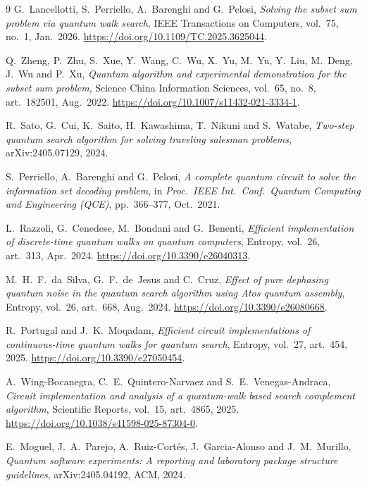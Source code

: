 \documentclass[11pt,a4paper]{article}
\begin{document}
\begin{thebibliography}{9}
G.~Lancellotti, S.~Perriello, A.~Barenghi and G.~Pelosi,
\emph{Solving the subset sum problem via quantum walk search},
IEEE Transactions on Computers, vol.~75, no.~1, Jan.~2026.
\url{https://doi.org/10.1109/TC.2025.3625044}.

Q.~Zheng, P.~Zhu, S.~Xue, Y.~Wang, C.~Wu, X.~Yu, M.~Yu, Y.~Liu, M.~Deng,
J.~Wu and P.~Xu,
\emph{Quantum algorithm and experimental demonstration for the subset sum
problem},
Science China Information Sciences, vol.~65, no.~8, art.~182501, Aug.~2022.
\url{https://doi.org/10.1007/s11432-021-3334-1}.

R.~Sato, G.~Cui, K.~Saito, H.~Kawashima, T.~Nikuni and S.~Watabe,
\emph{Two-step quantum search algorithm for solving traveling salesman
problems},
arXiv:2405.07129, 2024.

S.~Perriello, A.~Barenghi and G.~Pelosi,
\emph{A complete quantum circuit to solve the information set decoding
problem},
in \emph{Proc.\ IEEE Int.\ Conf.\ Quantum Computing and Engineering (QCE)},
pp.~366--377, Oct.~2021.

L.~Razzoli, G.~Cenedese, M.~Bondani and G.~Benenti,
\emph{Efficient implementation of discrete-time quantum walks on quantum
computers},
Entropy, vol.~26, art.~313, Apr.~2024.
\url{https://doi.org/10.3390/e26040313}.

M.~H.~F.~da~Silva, G.~F.~de~Jesus and C.~Cruz,
\emph{Effect of pure dephasing quantum noise in the quantum search algorithm
using Atos quantum assembly},
Entropy, vol.~26, art.~668, Aug.~2024.
\url{https://doi.org/10.3390/e26080668}.

R.~Portugal and J.~K.~Moqadam,
\emph{Efficient circuit implementations of continuous-time quantum walks for
quantum search},
Entropy, vol.~27, art.~454, 2025.
\url{https://doi.org/10.3390/e27050454}.

A.~Wing-Bocanegra, C.~E.~Quintero-Narvaez and S.~E.~Venegas-Andraca,
\emph{Circuit implementation and analysis of a quantum-walk based search
complement algorithm},
Scientific Reports, vol.~15, art.~4865, 2025.
\url{https://doi.org/10.1038/s41598-025-87304-0}.

E.~Moguel, J.~A.~Parejo, A.~Ruiz-Cort\'es, J.~Garcia-Alonso and
J.~M.~Murillo,
\emph{Quantum software experiments: A reporting and laboratory
package structure guidelines},
arXiv:2405.04192, ACM, 2024.
\end{thebibliography}
\end{document}
